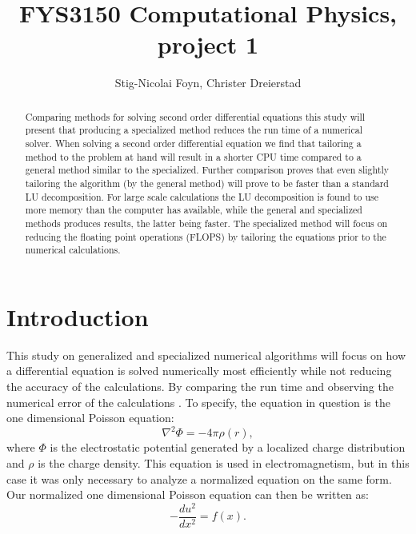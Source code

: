 \documentclass{emulateapj}
\begin{document}
\title{FYS3150 Computational Physics, project 1}

\author{Stig-Nicolai Foyn, Christer Dreierstad}





\begin{abstract}
Comparing methods for solving second order differential equations this study will present that producing a specialized method reduces the run time of a numerical solver. When solving a second order differential equation we find that tailoring a method to the problem at hand will result in a shorter CPU time compared to a general method similar to the specialized. Further comparison proves that even slightly tailoring the algorithm (by the general method) will prove to be faster than a standard LU decomposition. For large scale calculations the LU decomposition is found to use more memory than the computer has available, while the general and specialized methods produces results, the latter being faster. The specialized method will focus on reducing the floating point operations (FLOPS) by tailoring the equations prior to the numerical calculations. 


\end{abstract}

\section{Introduction}
\label{sec:introduction}
This study on generalized and specialized numerical algorithms will focus on how a differential equation is solved numerically most efficiently while not reducing the accuracy of the calculations. By comparing the run time and observing the numerical error of the calculations . To specify, the equation in question is the one dimensional Poisson equation:
%
\begin{equation*}
    {\nabla^{2}} \Phi = -4\pi \rho(r),
\end{equation*}
%
where $\Phi$ is the electrostatic potential generated by a localized charge distribution and $\rho$ is the charge density. This equation is used in electromagnetism, but in this case it was only necessary to analyze a normalized equation on the same form. Our normalized one dimensional Poisson equation can then be written as:
%
\begin{equation}\label{eq:-u''}
    -\frac{du^2}{dx^2} = f(x).
\end{equation}
\end{document}
